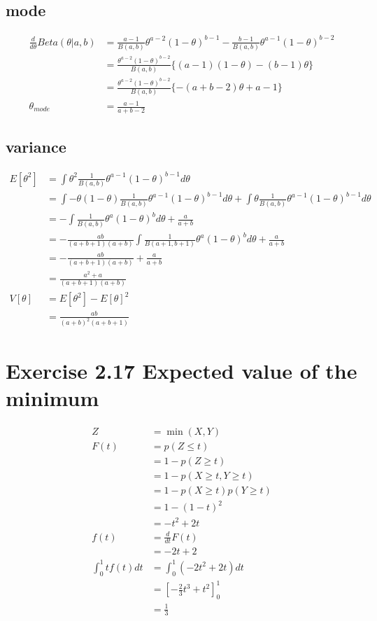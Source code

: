 \documentclass{jsarticle}
\begin{document}
\subsection*{mode}
\begin{align}
\frac{d}{d\theta}Beta(\theta|a,b) & = \frac{a-1}{B(a,b)}\theta^{a-2}(1-\theta)^{b-1}-\frac{b-1}{B(a,b)}\theta^{a-1}(1-\theta)^{b-2}\\
& = \frac{\theta^{a-2}(1-\theta)^{b-2}}{B(a,b)}\{(a-1)(1-\theta) - (b-1)\theta \} \\
& = \frac{\theta^{a-2}(1-\theta)^{b-2}}{B(a,b)}\{-(a + b - 2)\theta + a - 1 \}\\
\theta_{mode} & = \frac{a-1}{a+b-2}
\end{align}
\subsection*{variance}
\begin{align}
E[\theta^2] & = \int \theta^2\frac{1}{B(a,b)}\theta^{a-1}(1-\theta)^{b-1}d\theta\\
& = \int-\theta(1-\theta)\frac{1}{B(a,b)}\theta^{a-1}(1-\theta)^{b-1}d\theta + \int \theta \frac{1}{B(a,b)}\theta^{a-1}(1-\theta)^{b-1}d\theta\\
& = -\int\frac{1}{B(a,b)}\theta^a(1-\theta)^bd\theta + \frac{a}{a+b}\\
& = -\frac{ab}{(a+b+1)(a+b)}\int\frac{1}{B(a+1,b+1)}\theta^a(1-\theta)^bd\theta + \frac{a}{a+b}\\
& = -\frac{ab}{(a+b+1)(a+b)} + \frac{a}{a+b}\\
& = \frac{a^2+a}{(a+b+1)(a+b)}\\
V[\theta] & = E[\theta^2] - E[\theta]^2 \\
& = \frac{ab}{(a+b)^2(a+b+1)}
\end{align}

\section*{Exercise 2.17 Expected value of the minimum}
\begin{align}
Z & = \min(X,Y)\\
F(t) & = p(Z \leq t)\\
 & = 1 - p(Z \ge t)\\
 & = 1 - p(X \ge t, Y \ge t)\\
 & = 1 - p(X \ge t)p(Y \ge t)\\
 & = 1 - (1 - t)^2\\
 & = -t^2+2t \\
f(t) & = \frac{d}{dt}F(t)\\
 & = -2t + 2\\
\int_{0}^{1}tf(t)dt & = \int_{0}^{1}(-2t^2+2t)dt\\
 & = [-\frac{2}{3}t^3+t^2]_0^1\\
 & = \frac{1}{3}
\end{align}
\end{document}
